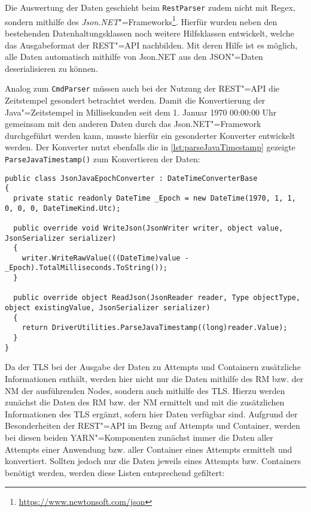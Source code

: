 Die Auswertung der Daten geschieht beim \texttt{RestParser} zudem nicht mit Regex, sondern mithilfe des \emph{Json.NET}"=Frameworks\footnote{\url{https://www.newtonsoft.com/json}}.
Hierfür wurden neben den bestehenden Datenhaltungsklassen noch weitere Hilfsklassen entwickelt, welche das Ausgabeformat der REST"=API nachbilden.
Mit deren Hilfe ist es möglich, alle Daten automatisch mithilfe von Json.NET aus den JSON"=Daten deserialisieren zu können.

Analog zum \texttt{CmdParser} müssen auch bei der Nutzung der REST"=API die Zeitstempel gesondert betrachtet werden.
Damit die Konvertierung der Java"=Zeitstempel in Millisekunden seit dem 1. Januar 1970 00:00:00 Uhr gemeinsam mit den anderen Daten durch das Json.NET"=Framework durchgeführt werden kann, musste hierfür ein gesonderter Konverter entwickelt werden.
Der Konverter nutzt ebenfalls die in \cref{lst:parseJavaTimestamp} gezeigte \texttt{ParseJavaTimestamp()} zum Konvertieren der Daten:

\begin{lstlisting}[label=lst:javaEpochConverter,style=cs,
caption={[Entwickelter Konverter für Java"=Zeitstempel zur Nutzung mit Json.NET]
    Entwickelter Konverter für Java"=Zeitstempel zur Nutzung mit Json.NET.
    Dieser erbt dafür von \texttt{DateTimeConverterBase} des Json.NET"=Frameworks, damit der \texttt{JsonJavaEpochConverter} auch zur Deserialisierung genutzt werden kann.}]
public class JsonJavaEpochConverter : DateTimeConverterBase
{
  private static readonly DateTime _Epoch = new DateTime(1970, 1, 1, 0, 0, 0, DateTimeKind.Utc);

  public override void WriteJson(JsonWriter writer, object value, JsonSerializer serializer)
  {
    writer.WriteRawValue(((DateTime)value - _Epoch).TotalMilliseconds.ToString());
  }
  
  public override object ReadJson(JsonReader reader, Type objectType, object existingValue, JsonSerializer serializer)
  {
    return DriverUtilities.ParseJavaTimestamp((long)reader.Value);
  }
}
\end{lstlisting}

Da der \ac{TLS} bei der Ausgabe der Daten zu Attempts und Containern zusätzliche Informationen enthält, werden hier nicht nur die Daten mithilfe des \ac{RM} bzw. der \ac{NM} der ausführenden Nodes, sondern auch mithilfe des \ac{TLS}.
Hierzu werden zunächst die Daten des \ac{RM} bzw. der \ac{NM} ermittelt und mit die zusätzlichen Informationen des \ac{TLS} ergänzt, sofern hier Daten verfügbar sind.
Aufgrund der Besonderheiten der REST"=API im Bezug auf Attempts und Container, werden bei diesen beiden \ac{YARN}"=Komponenten zunächst immer die Daten aller Attempts einer Anwendung bzw. aller Container eines Attempts ermittelt und konvertiert.
Sollten jedoch nur die Daten jeweils eines Attempts bzw. Containers benötigt werden, werden diese Listen entsprechend gefiltert:

